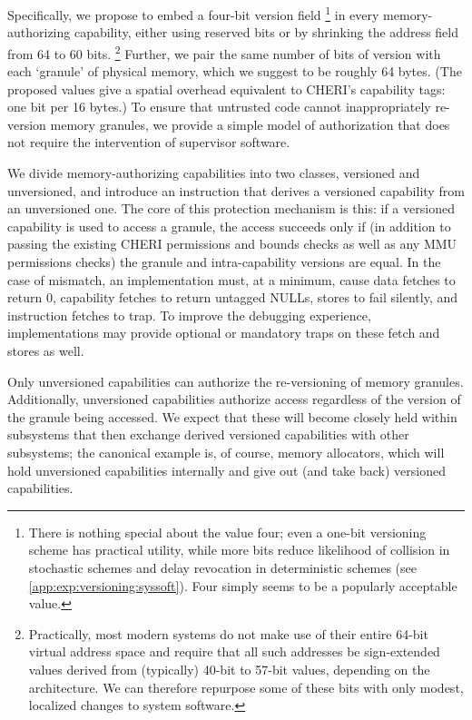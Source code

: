 Specifically, we propose to embed a four-bit version field%
%
\footnote{There is nothing special about the value four; even a one-bit
versioning scheme has practical utility, while more bits reduce likelihood of
collision in stochastic schemes and delay revocation in deterministic schemes
(see \cref{app:exp:versioning:syssoft}).  Four simply seems to be a popularly
acceptable value.}
%
in every memory-authorizing capability, either using reserved bits or by
shrinking the address field from 64 to 60 bits.%
%
\footnote{Practically, most modern systems do not make use of their entire
64-bit virtual address space and require that all such addresses be
sign-extended values derived from (typically) 40-bit to 57-bit values,
depending on the architecture.  We can therefore repurpose some of these bits
with only modest, localized changes to system software.}
%
Further, we pair the same number of bits of version with each `granule' of
physical memory, which we suggest to be roughly 64 bytes.  (The proposed values
give a spatial overhead equivalent to CHERI's capability tags: one bit per 16
bytes.)  To ensure that untrusted code cannot inappropriately re-version memory
granules, we provide a simple model of authorization that does not require the
intervention of supervisor software.

We divide memory-authorizing capabilities into two classes, versioned and
unversioned, and introduce an instruction that derives a versioned capability
from an unversioned one.  The core of this protection mechanism is this: if a
versioned capability is used to access a granule, the access succeeds only if
(in addition to passing the existing CHERI permissions and bounds checks as
well as any MMU permissions checks) the granule and intra-capability versions
are equal.  In the case of mismatch, an implementation must, at a minimum,
cause data fetches to return $0$, capability fetches to return untagged NULLs,
stores to fail silently, and instruction fetches to trap.  To improve the
debugging experience, implementations may provide optional or mandatory traps
on these fetch and stores as well.

Only unversioned capabilities can authorize the re-versioning of memory
granules.  Additionally, unversioned capabilities authorize access regardless
of the version of the granule being accessed.  We expect that these will become
closely held within subsystems that then exchange derived versioned
capabilities with other subsystems; the canonical example is, of course, memory
allocators, which will hold unversioned capabilities internally and give out
(and take back) versioned capabilities.


